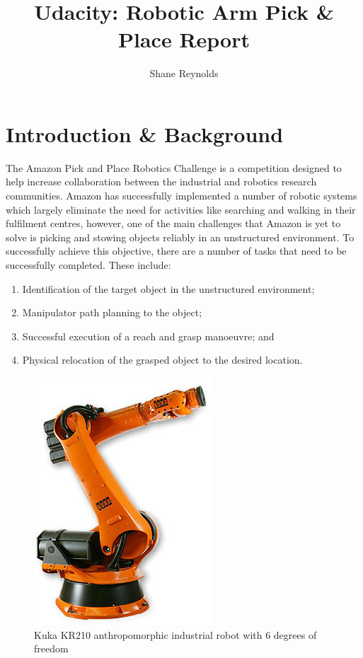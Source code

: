 \documentclass[a4paper]{article}
\begin{document}
\title{Udacity: Robotic Arm Pick \& Place Report}
\author{Shane Reynolds}
\maketitle

\section{Introduction \& Background}
The Amazon Pick and Place Robotics Challenge is a competition designed to help increase collaboration between the industrial and robotics research communities. Amazon has successfully implemented a number of robotic systems which largely eliminate the need for activities like searching and walking in their fulfilment centres, however, one of the main challenges that Amazon is yet to solve is picking and stowing objects reliably in an unstructured environment. To successfully achieve this objective, there are a number of tasks that need to be successfully completed. These include:
\begin{enumerate}
\item Identification of the target object in the unstructured environment;
\item Manipulator path planning to the object;
\item Successful execution of a reach and grasp manoeuvre; and
\item Physical relocation of the grasped object to the desired location.
\end{enumerate}

\begin{figure}[h]
\centering
\includegraphics[scale=0.5]{image1}
\caption{Kuka KR210 anthropomorphic industrial robot with 6 degrees of freedom}
\end{figure}
\end{document}
